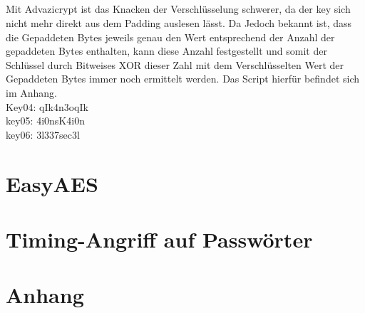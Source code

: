 \documentclass[12pt]{article}
\theoremstyle{plain}
\begin{document}
\subsection{}
Mit Advazicrypt ist das Knacken der Verschlüsselung schwerer, da der key sich nicht mehr direkt aus dem Padding auslesen lässt. Da Jedoch bekannt ist, dass die Gepaddeten Bytes jeweils genau den Wert entsprechend der Anzahl der gepaddeten Bytes enthalten, kann diese Anzahl festgestellt und somit der Schlüssel durch Bitweises XOR dieser Zahl mit dem Verschlüsselten Wert der Gepaddeten Bytes immer noch ermittelt werden. Das Script hierfür befindet sich im Anhang.\\
Key04: qIk4n3oqIk\\
key05: 4i0nsK4i0n\\
key06: 3l337sec3l\\
\section{EasyAES}
\section{Timing-Angriff auf Passwörter}
\section{Anhang}
\end{document}
